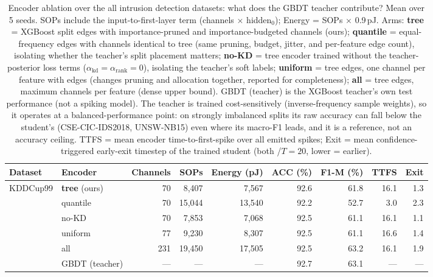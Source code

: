 \begin{table}[!ht]
\centering
\renewcommand{\arraystretch}{1.05}
\caption{Encoder ablation over the all intrusion detection datasets: what does the GBDT teacher contribute? Mean over 5 seeds. SOPs include the input-to-first-layer term (channels $\times$ hidden$_0$); Energy = SOPs $\times$ 0.9\,pJ. Arms: \textbf{tree} = XGBoost split edges with importance-pruned and importance-budgeted channels (ours); \textbf{quantile} = equal-frequency edges with channels identical to tree (same pruning, budget, jitter, and per-feature edge count), isolating whether the teacher's split placement matters; \textbf{no-KD} = tree encoder trained without the teacher-posterior loss terms ($\alpha_{\mathrm{kd}} = \alpha_{\mathrm{rank}} = 0$), isolating the teacher's soft labels; \textbf{uniform} = tree edges, one channel per feature with edges (changes pruning and allocation together, reported for completeness); \textbf{all} = tree edges, maximum channels per feature (dense upper bound). GBDT (teacher) is the XGBoost teacher's own test performance (not a spiking model). The teacher is trained cost-sensitively (inverse-frequency sample weights), so it operates at a balanced-performance point: on strongly imbalanced splits its raw accuracy can fall below the student's (CSE-CIC-IDS2018, UNSW-NB15) even where its macro-F1 leads, and it is a reference, not an accuracy ceiling. TTFS = mean encoder time-to-first-spike over all emitted spikes; Exit = mean confidence-triggered early-exit timestep of the trained student (both /$T{=}20$, lower = earlier).}
\label{tab:encoder_ablation_full}
{\scriptsize
\begin{tabular}{l l r r r r r r r}
\toprule
\textbf{Dataset} & \textbf{Encoder} & \textbf{Channels} & \textbf{SOPs} & \textbf{Energy (pJ)} & \textbf{ACC (\%)} & \textbf{F1-M (\%)} & \textbf{TTFS} & \textbf{Exit} \\
\midrule
\multirow{6}{*}{KDDCup99}
& \textbf{tree} (ours) & 70 & 8,407 & 7,567 & 92.6 & 61.8 & 16.1 & 1.3 \\
& quantile & 70 & 15,044 & 13,540 & 92.2 & 52.7 & 3.0 & 2.3 \\
& no-KD & 70 & 7,853 & 7,068 & 92.5 & 61.1 & 16.1 & 1.1 \\
& uniform & 77 & 9,230 & 8,307 & 92.5 & 61.1 & 16.6 & 1.4 \\
& all & 231 & 19,450 & 17,505 & 92.5 & 63.2 & 16.1 & 1.9 \\
& GBDT (teacher) & --- & --- & --- & 92.7 & 63.1 & --- & --- \\

\end{tabular}}
\end{table}
